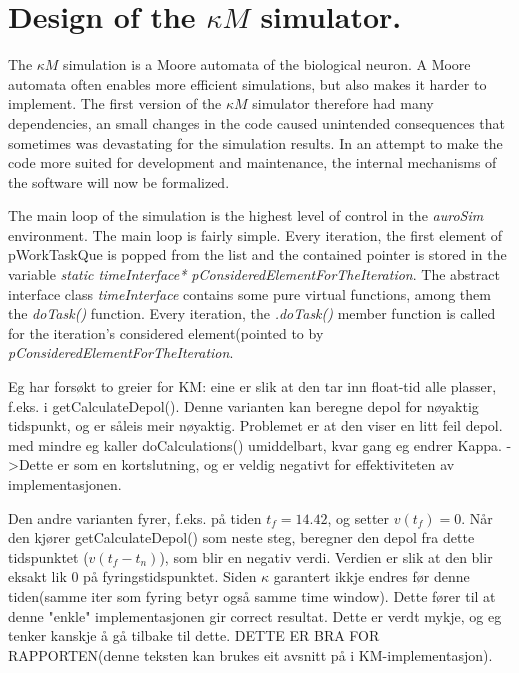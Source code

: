 
\section{Design of the $\kappa M$ simulator.}

The $\kappa M$ simulation is a Moore automata of the biological neuron. %
A Moore automata often enables more efficient simulations, but also makes it harder to implement. %
The first version of the $\kappa M$ simulator therefore had many dependencies, an small changes in the code caused unintended consequences that sometimes was devastating for the simulation results.
In an attempt to make the code more suited for development and maintenance, the internal mechanisms of the software will now be formalized.

The main loop of the simulation is the highest level of control in the \emph{auroSim} environment.
The main loop is fairly simple. 
Every iteration, the first element of pWorkTaskQue is popped from the list and the contained pointer is stored in the variable \emph{static timeInterface* pConsideredElementForTheIteration}.
The abstract interface class \emph{timeInterface} contains some pure virtual functions, among them the \emph{doTask()} function.
Every iteration, the \emph{.doTask()} member function is called for the iteration's considered element(pointed to by \emph{pConsideredElementForTheIteration}.




Eg har forsøkt to greier for KM: eine er slik at den tar inn float-tid alle plasser, f.eks. i getCalculateDepol().
Denne varianten kan beregne depol for nøyaktig tidspunkt, og er såleis meir nøyaktig. Problemet er at den viser en litt feil depol. med mindre eg kaller doCalculations() umiddelbart, kvar gang eg endrer Kappa.
	->Dette er som en kortslutning, og er veldig negativt for effektiviteten av implementasjonen. 

Den andre varianten fyrer, f.eks. på tiden $t_f=14.42$, og setter $v(t_f)=0$. 
Når den kjører getCalculateDepol() som neste steg, beregner den depol fra dette tidspunktet ($v(t_f-t_n)$), som blir en negativ verdi. 
Verdien er slik at den blir eksakt lik 0 på fyringstidspunktet. Siden $\kappa$ garantert ikkje endres før denne tiden(samme iter som fyring betyr også samme time window).
Dette fører til at denne "enkle" implementasjonen gir correct resultat. Dette er verdt mykje, og eg tenker kanskje å gå tilbake til dette.
DETTE ER BRA FOR RAPPORTEN(denne teksten kan brukes eit avsnitt på i KM-implementasjon).
